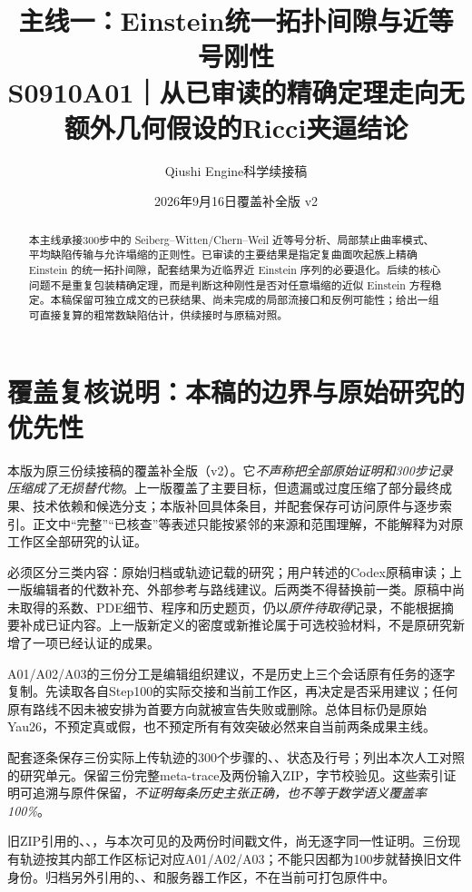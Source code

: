 \documentclass[UTF8,a4paper,11pt,fontset=fandol]{ctexart}
\title{主线一：Einstein统一拓扑间隙与近等号刚性\\[0.5em]{\large S0910A01｜从已审读的精确定理走向无额外几何假设的Ricci夹逼结论}}
\author{Qiushi Engine\quad 科学续接稿}
\date{2026年9月16日\quad 覆盖补全版 v2}
\numberwithin{equation}{section}
\theoremstyle{definition}
\begin{document}
\maketitle
\begin{abstract}
本主线承接300步中的 Seiberg--Witten/Chern--Weil 近等号分析、局部禁止曲率模式、平均缺陷传输与允许塌缩的正则性。已审读的主要结果是指定复曲面吹起族上精确 Einstein 的统一拓扑间隙，配套结果为近临界近 Einstein 序列的必要退化。后续的核心问题不是重复包装精确定理，而是判断这种刚性是否对任意塌缩的近似 Einstein 方程稳定。本稿保留可独立成文的已获结果、尚未完成的局部流接口和反例可能性；给出一组可直接复算的粗常数缺陷估计，供续接时与原稿对照。
\end{abstract}
\begingroup
\small\linespread{1.0}\selectfont\setlength{\parskip}{0pt}
\tableofcontents
\endgroup
\clearpage

\section*{覆盖复核说明：本稿的边界与原始研究的优先性}
本版为原三份续接稿的覆盖补全版（v2）。它\emph{不声称把全部原始证明和300步记录压缩成了无损替代物}。上一版覆盖了主要目标，但遗漏或过度压缩了部分最终成果、技术依赖和候选分支；本版补回具体条目，并配套保存可访问原件与逐步索引。正文中“完整”“已核查”等表述只能按紧邻的来源和范围理解，不能解释为对原工作区全部研究的认证。

必须区分三类内容：原始归档或轨迹记载的研究；用户转述的Codex原稿审读；上一版编辑者的代数补充、外部参考与路线建议。后两类不得替换前一类。原稿中尚未取得的系数、PDE细节、程序和历史题页，仍以\emph{原件待取得}记录，不能根据摘要补成已证内容。上一版新定义的密度或新推论属于可选校验材料，不是原研究新增了一项已经认证的成果。

A01/A02/A03的三份分工是编辑组织建议，不是历史上三个会话原有任务的逐字复制。先读取各自Step100的实际交接和当前工作区，再决定是否采用建议；任何原有路线不因未被安排为首要方向就被宣告失败或删除。总体目标仍是原始Yau26，不预定真或假，也不预定所有有效突破必然来自当前两条成果主线。

配套逐条保存三份实际上传轨迹的300个步骤的、、状态及行号；列出本次人工对照的研究单元。保留三份完整meta-trace及两份输入ZIP，字节校验见。这些索引证明可追溯与原件保留，\emph{不证明每条历史主张正确，也不等于数学语义覆盖率100\%}。

旧ZIP引用的、、，与本次可见的及两份时间戳文件，尚无逐字同一性证明。三份现有轨迹按其内部工作区标记对应A01/A02/A03；不能只因都为100步就替换旧文件身份。归档另外引用的、、和服务器工作区，不在当前可打包原件中。
\end{document}
